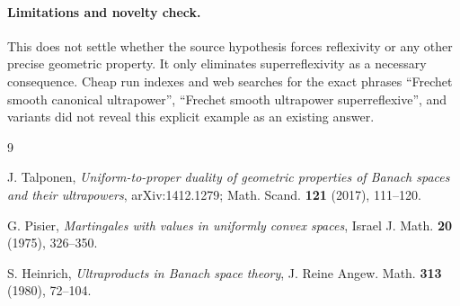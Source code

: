 \documentclass[11pt]{article}
\begin{document}
\paragraph{Limitations and novelty check.}
This does not settle whether the source hypothesis forces reflexivity or any
other precise geometric property.  It only eliminates superreflexivity as a
necessary consequence.  Cheap run indexes and web searches for the exact
phrases ``Frechet smooth canonical ultrapower'', ``Frechet smooth ultrapower
superreflexive'', and variants did not reveal this explicit example as an
existing answer.

\begin{thebibliography}{9}

J. Talponen,
\emph{Uniform-to-proper duality of geometric properties of Banach spaces and
their ultrapowers},
arXiv:1412.1279; Math. Scand. \textbf{121} (2017), 111--120.

G. Pisier,
\emph{Martingales with values in uniformly convex spaces},
Israel J. Math. \textbf{20} (1975), 326--350.

S. Heinrich,
\emph{Ultraproducts in Banach space theory},
J. Reine Angew. Math. \textbf{313} (1980), 72--104.

\end{thebibliography}
\end{document}

